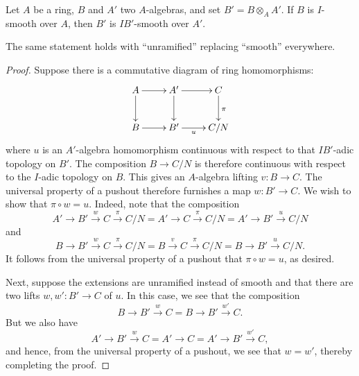 \begin{theorem}
    Let $A$ be a ring, $B$ and $A'$ two $A$-algebras, and set $B' = B\otimes_A A'$. If $B$ is $I$-smooth over $A$, then $B'$ is $IB'$-smooth over $A'$.

    The same statement holds with ``unramified'' replacing ``smooth'' everywhere.
\end{theorem}
\begin{proof}
    Suppose there is a commutative diagram of ring homomorphisms: 
    \begin{equation*}
        \xymatrix{
            A\ar[r]\ar[d] & A'\ar[d]\ar[r] & C\ar[d]^\pi\\
            B\ar[r] & B'\ar[r]_-{u} & C/N
        }
    \end{equation*}
    where $u$ is an $A'$-algebra homomorphism continuous with respect to that $IB'$-adic topology on $B'$. The composition $B\to C/N$ is therefore continuous with respect to the $I$-adic topology on $B$. This gives an $A$-algebra lifting $v\colon B\to C$. The universal property of a pushout therefore furnishes a map $w\colon B'\to C$. We wish to show that $\pi\circ w = u$. Indeed, note that the composition 
    \begin{equation*}
        A'\to B'\xrightarrow{w} C\xrightarrow{\pi} C/N = A'\to C\xrightarrow{\pi} C/N = A'\to B'\xrightarrow{u} C/N
    \end{equation*}
    and 
    \begin{equation*}
        B\to B'\xrightarrow{w} C\xrightarrow{\pi} C/N = B\xrightarrow{v} C\xrightarrow{\pi} C/N = B\to B'\xrightarrow{u} C/N.
    \end{equation*}
    It follows from the universal property of a pushout that $\pi\circ w = u$, as desired. 

    Next, suppose the extensions are unramified instead of smooth and that there are two lifts $w, w'\colon B'\to C$ of $u$. In this case, we see that the composition 
    \begin{equation*}
        B\to B'\xrightarrow{w} C = B\to B'\xrightarrow{w'} C.
    \end{equation*}
    But we also have 
    \begin{equation*}
        A'\to B'\xrightarrow{w} C = A'\to C = A'\to B'\xrightarrow{w'} C,
    \end{equation*}
    and hence, from the universal property of a pushout, we see that $w = w'$, thereby completing the proof.
\end{proof}

